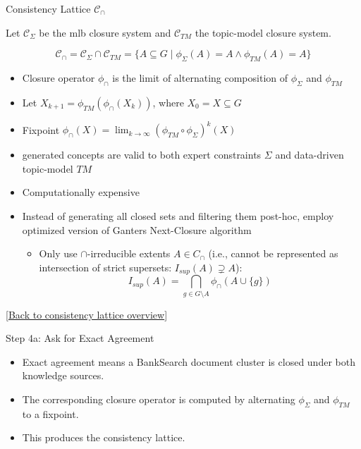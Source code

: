 \begin{frame}{Consistency Lattice $\mathcal{C}_{\cap}$}
\hypertarget{appendix:consistency-detail}{}

    Let $\mathcal{C}_{\Sigma}$ be the \ac{mlb} closure system and $\mathcal{C}_{TM}$ the topic-model closure system. 

\[
\mathcal{C}_{\cap}
= \mathcal{C}_{\Sigma}\cap\mathcal{C}_{TM}
= \{A\subseteq G \mid \phi_{\Sigma}(A)=A \land \phi_{TM}(A)=A\}
\]

\begin{itemize}
  \item Closure operator $\phi_{\cap}$ is the limit of alternating composition of $\phi_{\Sigma}$ and $\phi_{TM}$
  \item Let $X_{k+1} =\phi_{TM}(\phi_{\cap}(X_k))$, where $X_0 = X \subseteq G$
  \item Fixpoint $\phi_\cap(X) = \lim_{k\to\infty} (\phi_{TM} \circ \phi_\Sigma)^k(X)$
  \item[$\rightarrow$] generated concepts are valid to both expert constraints $\Sigma$ and data-driven topic-model $TM$
  \item[\danger] Computationally expensive
  \item[$\rightarrow$] Instead of generating all closed sets and filtering them post-hoc, employ optimized version of Ganters Next-Closure algorithm
  \begin{itemize}
    \item Only use $\cap$-irreducible extents $A \in C_{\cap}$ (i.e., cannot be represented as intersection of strict supersets: $I_{sup}(A) \supsetneq A$):
    \[
    I_{sup}(A) = \bigcap_{g \in G \setminus A} \phi_\cap(A \cup \{g\})
    \]
  \end{itemize}
\end{itemize}
{\tiny[\hyperlink{main:consistency-overview}{Back to consistency lattice overview}]}
\end{frame}


\begin{frame}{Step 4a: Ask for Exact Agreement}

\begin{itemize}
    \item Exact agreement means a BankSearch document cluster is closed under both knowledge sources.
    \item The corresponding closure operator is computed by alternating $\phi_{\Sigma}$ and $\phi_{TM}$ to a fixpoint.
    \item This produces the consistency lattice.
\end{itemize}
\end{frame}

